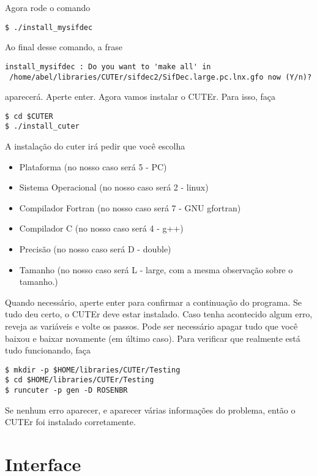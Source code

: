 \documentclass[letterpaper,11pt]{article}
\numberwithin{equation}{section}
\begin{document}
Agora rode o comando
\begin{verbatim}
$ ./install_mysifdec
\end{verbatim}
Ao final desse comando, a frase
\begin{verbatim}
install_mysifdec : Do you want to 'make all' in
 /home/abel/libraries/CUTEr/sifdec2/SifDec.large.pc.lnx.gfo now (Y/n)?
\end{verbatim}
aparecerá. Aperte enter. Agora vamos instalar o CUTEr. Para isso, faça
\begin{verbatim}
$ cd $CUTER
$ ./install_cuter
\end{verbatim}
A instalação do cuter irá pedir que você escolha
\begin{itemize}
 \item Plataforma (no nosso caso será 5 - PC)
 \item Sistema Operacional (no nosso caso será 2 - linux)
 \item Compilador Fortran (no nosso caso será 7 - GNU gfortran)
 \item Compilador C (no nosso caso será 4 - g++)
 \item Precisão (no nosso caso será D - double)
 \item Tamanho (no nosso caso será L - large, com a mesma observação sobre o tamanho.)
\end{itemize}
Quando necessário, aperte enter para confirmar a continuação do programa. Se tudo deu
certo, o CUTEr deve estar instalado. Caso tenha acontecido algum erro, reveja as variáveis
e volte os passos. Pode ser necessário apagar tudo que você baixou e baixar novamente (em 
último caso). Para verificar que realmente está tudo funcionando, faça
\begin{verbatim}
$ mkdir -p $HOME/libraries/CUTEr/Testing
$ cd $HOME/libraries/CUTEr/Testing
$ runcuter -p gen -D ROSENBR
\end{verbatim}
Se nenhum erro aparecer, e aparecer várias informações do problema, então o
CUTEr foi instalado corretamente.

\section{Interface}
\end{document}
